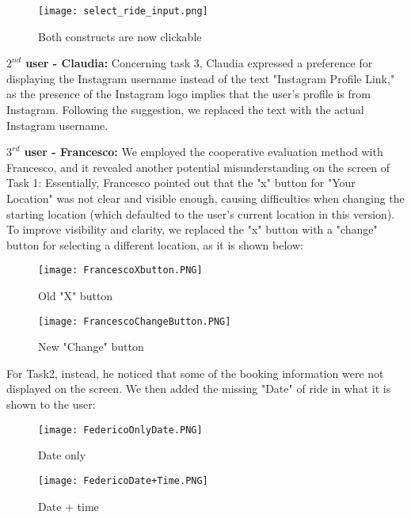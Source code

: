 \documentclass{article}
\begin{document}
\begin{figure}[htbp]
    \centering
    \texttt{[image: select\_ride\_input.png]}
    \caption{Both constructs are now clickable}
\end{figure}

\textbf{$2^{nd}$ user - Claudia:} Concerning task 3, Claudia expressed a preference for displaying the Instagram username instead of the text "Instagram Profile Link," as the presence of the Instagram logo implies that the user's profile is from Instagram. Following the suggestion, we replaced the text with the actual Instagram username. \newpage

\textbf{$3^{rd}$ user - Francesco:} We employed the cooperative evaluation method with Francesco, and it revealed another potential misunderstanding on the screen of Task 1: Essentially, Francesco pointed out that the "x" button for "Your Location" was not clear and visible enough, causing difficulties when changing the starting location (which defaulted to the user's current location in this version). To improve visibility and clarity, we replaced the "x" button with a "change" button for selecting a different location, as it is shown below: 

\begin{figure}[htbp]
\begin{minipage}[t]{0.25\textwidth}
\texttt{[image: FrancescoXbutton.PNG]}
\caption{Old "X" button}
\end{minipage}
\hfill
\begin{minipage}[t]{0.25\textwidth}
\texttt{[image: FrancescoChangeButton.PNG]}
\caption{New "Change" button}
\end{minipage}
\end{figure}
\newpage

For Task2, instead, he noticed that some of the booking information were not displayed on the screen. We then added the missing "Date" of ride in what it is shown to the user: 

\begin{figure}[htbp]
\begin{minipage}[t]{0.25\textwidth}
\texttt{[image: FedericoOnlyDate.PNG]}
\caption{Date only}
\end{minipage}
\hfill
\begin{minipage}[t]{0.25\textwidth}
\texttt{[image: FedericoDate+Time.PNG]}
\caption{Date + time}
\end{minipage}
\end{figure}
\end{document}
